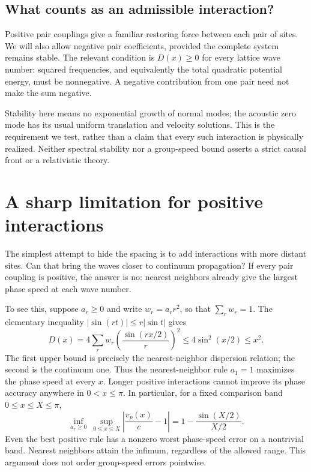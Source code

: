 \documentclass[11pt]{article}
\begin{document}
\subsection{What counts as an admissible interaction?}
Positive pair couplings give a familiar restoring force between each pair of sites. We will also allow negative pair coefficients, provided the complete system remains stable. The relevant condition is $D(x)\geq0$ for every lattice wave number: squared frequencies, and equivalently the total quadratic potential energy, must be nonnegative. A negative contribution from one pair need not make the sum negative.

Stability here means no exponential growth of normal modes; the acoustic zero mode has its usual uniform translation and velocity solutions. This is the requirement we test, rather than a claim that every such interaction is physically realized. Neither spectral stability nor a group-speed bound asserts a strict causal front or a relativistic theory.

\section{A sharp limitation for positive interactions}
The simplest attempt to hide the spacing is to add interactions with more distant sites. Can that bring the waves closer to continuum propagation? If every pair coupling is positive, the answer is no: nearest neighbors already give the largest phase speed at each wave number.

To see this, suppose $a_r\geq0$ and write $w_r=a_r r^2$, so that $\sum_r w_r=1$. The elementary inequality $|\sin(rt)|\leq r|\sin t|$ gives
\begin{equation}\label{positive}
 D(x)=4\sum_r w_r\left(\frac{\sin(rx/2)}{r}\right)^2
 \leq4\sin^2(x/2)\leq x^2.
\end{equation}
The first upper bound is precisely the nearest-neighbor dispersion relation; the second is the continuum one. Thus the nearest-neighbor rule $a_1=1$ maximizes the phase speed at every $x$. Longer positive interactions cannot improve its phase accuracy anywhere in $0<x\leq\pi$. In particular, for a fixed comparison band $0\leq x\leq X\leq\pi$,
\begin{equation}
 \inf_{a_r\geq0}\ \sup_{0\leq x\leq X}
 \left|\frac{v_p(x)}c-1\right|
 =1-\frac{\sin(X/2)}{X/2}.
\end{equation}
Even the best positive rule has a nonzero worst phase-speed error on a nontrivial band. Nearest neighbors attain the infimum, regardless of the allowed range. This argument does not order group-speed errors pointwise.
\end{document}
